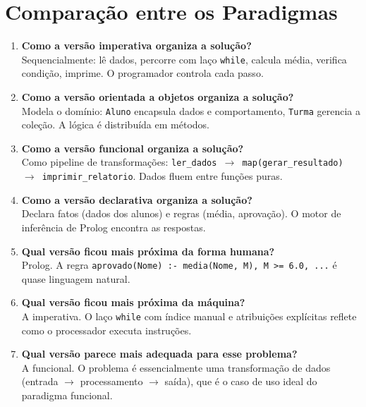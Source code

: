 \documentclass[12pt, a4paper]{article}
\begin{document}
\section{Comparação entre os Paradigmas}

\begin{enumerate}
    \item \textbf{Como a versão imperativa organiza a solução?}\\
    Sequencialmente: lê dados, percorre com laço \texttt{while}, calcula média, verifica condição, imprime. O programador controla cada passo.

    \item \textbf{Como a versão orientada a objetos organiza a solução?}\\
    Modela o domínio: \texttt{Aluno} encapsula dados e comportamento, \texttt{Turma} gerencia a coleção. A lógica é distribuída em métodos.

    \item \textbf{Como a versão funcional organiza a solução?}\\
    Como pipeline de transformações: \texttt{ler\_dados $\rightarrow$ map(gerar\_resultado) $\rightarrow$ imprimir\_relatorio}. Dados fluem entre funções puras.

    \item \textbf{Como a versão declarativa organiza a solução?}\\
    Declara fatos (dados dos alunos) e regras (média, aprovação). O motor de inferência de Prolog encontra as respostas.

    \item \textbf{Qual versão ficou mais próxima da forma humana?}\\
    Prolog. A regra \texttt{aprovado(Nome) :- media(Nome, M), M >= 6.0, ...} é quase linguagem natural.

    \item \textbf{Qual versão ficou mais próxima da máquina?}\\
    A imperativa. O laço \texttt{while} com índice manual e atribuições explícitas reflete como o processador executa instruções.

    \item \textbf{Qual versão parece mais adequada para esse problema?}\\
    A funcional. O problema é essencialmente uma transformação de dados (entrada $\rightarrow$ processamento $\rightarrow$ saída), que é o caso de uso ideal do paradigma funcional.
\end{enumerate}
\end{document}
